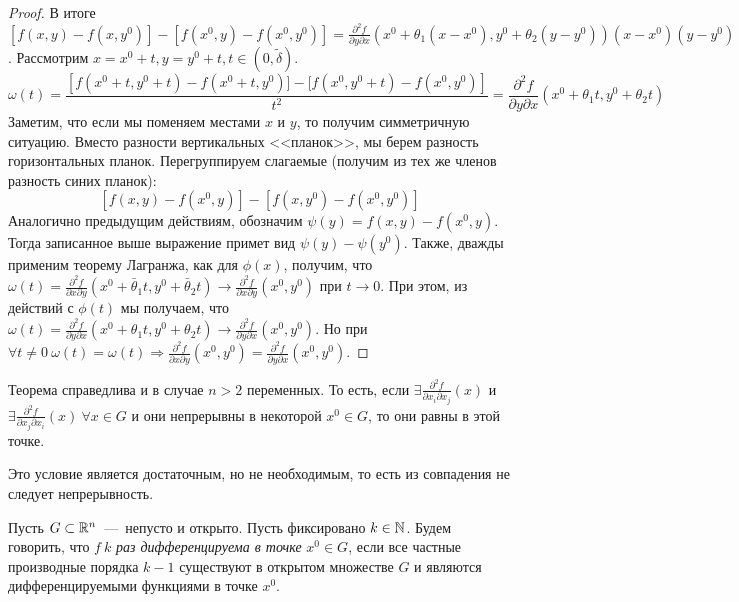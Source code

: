\begin{proof}
    \noindent В итоге $\left[f(x, y) - f(x, y^0)\right] - \left[f(x^0, y) - f(x^0, y^0)\right] = \frac{\partial^2 f}{\partial y \partial x} \left(x^0 + \theta_1(x - x^0), y^0 + \theta_2(y - y^0)\right)(x - x^0)(y - y^0)$. Рассмотрим $x = x^0 + t, y = y^0 + t, t \in (0, \widetilde{\delta})$. $$\omega(t) = \frac{\left[f(x^0 + t, y^0 + t) - f(x^0 + t, y^0)] - [f(x^0, y^0 + t) - f(x^0, y^0)\right]}{t^2} = \frac{\partial^2 f}{\partial y \partial x}(x^0 + \theta_1t, y^0 + \theta_2t)$$
    Заметим, что если мы поменяем местами $x$ и $y$, то получим симметричную ситуацию. Вместо разности вертикальных <<планок>>, мы берем разность горизонтальных планок. Перегруппируем слагаемые (получим из тех же членов разность синих планок): 
    $$[f(x, y) - f(x^0, y)] - [f(x, y^0) - f(x^0, y^0)]$$
    Аналогично предыдущим действиям, обозначим $\psi(y) = f(x, y) - f(x^0, y)$. Тогда записанное выше выражение примет вид $\psi(y) - \psi(y^0)$. Также, дважды применим теорему Лагранжа, как для $\phi(x)$, получим, что $\omega(t) = \frac{\partial^2 f}{\partial x \partial y}(x^0 + \bar \theta_1t, y^0 + \bar\theta_2t) \longrightarrow \frac{\partial^2f}{\partial x \partial y}(x^0, y^0)$ при $t \rightarrow 0$. При этом, из действий с $\phi(t)$ мы получаем, что $\omega(t) = \frac{\partial^2f}{\partial y \partial x}(x^0 + \theta_1 t, y^0 + \theta_2 t) \longrightarrow \frac{\partial^2f}{\partial y \partial x}(x^0, y^0)$. Но при $\forall t \neq 0 \ \omega(t) = \omega(t) \Rightarrow \frac{\partial^2 f}{\partial x \partial y}(x^0, y^0) = \frac{\partial ^ 2 f}{\partial y \partial x}(x^0, y^0)$.
\end{proof} 
\begin{note}
    Теорема справедлива и в случае $n > 2$ переменных. То есть, если $\exists \frac{\partial^2 f}{\partial x_i \partial x_j}(x)$ и $\exists \frac{\partial^2 f}{\partial x_j \partial x_i}(x) \ \forall x \in G$ и они непрерывны в некоторой $x^0 \in G$, то они равны в этой точке. 
\end{note}
\begin{note}
    Это условие является достаточным, но не необходимым, то есть из совпадения не следует непрерывность.
\end{note}
\begin{definition}
    Пусть $G \subset \mathbb{R}^n$~---~непусто и открыто. Пусть фиксировано $k \in \mathbb{N}$. Будем говорить, что $f \ k$ \textit{раз дифференцируема в точке} $x^0 \in G $, если все частные производные порядка $k - 1$ существуют в открытом множестве $G$ и являются дифференцируемыми функциями в точке $x^0$. 
\end{definition}